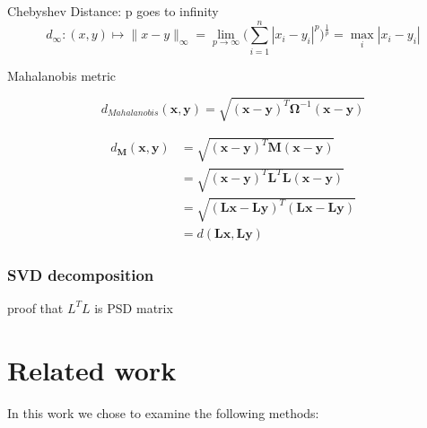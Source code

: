 \documentclass[12pt,a4paper]{report}
\begin{document}
Chebyshev Distance: p goes to infinity
\begin{equation}
d_{\mathbf{\infty}} : (x, y) \mapsto \|x-y\|_\infty = \lim_{p \rightarrow \infty}\bigg(\sum_{i=1}^{n} |x_i-y_i|^p\bigg)^\frac{1}{p} = \max_{i} |x_i-y_i|
\end{equation}

Mahalanobis metric

\begin{equation}
d_{Mahalanobis}(\textbf{x},\textbf{y}) = \sqrt{(\textbf{x}-\textbf{y})^T\bm{\Omega}^{-1}(\textbf{x}-\textbf{y})} 
\end{equation}

\cite{mahalanobis1936generalized}

\begin{align*}
  d_{\bm{M}}(\textbf{x},\textbf{y}) &= \sqrt{(\textbf{x}-\textbf{y})^{T}\bm{M}(\textbf{x}-\textbf{y})} \\
         &= \sqrt{(\textbf{x}-\textbf{y})^{T}\bm{L}^{T}\bm{L}(\textbf{x}-\textbf{y})} \\
         &= \sqrt{(\bm{L}\textbf{x}-\bm{L}\textbf{y})^{T}(\bm{L}\textbf{x}-\bm{L}\textbf{y})} \\
         &= d(\bm{L}\textbf{x}, \bm{L}\textbf{y})
\end{align*}

\subsection{SVD decomposition}

proof that $L^TL$ is PSD matrix



\chapter{Related work} \label{chap:related-work}

In this work we chose to examine the following methods:
\end{document}
